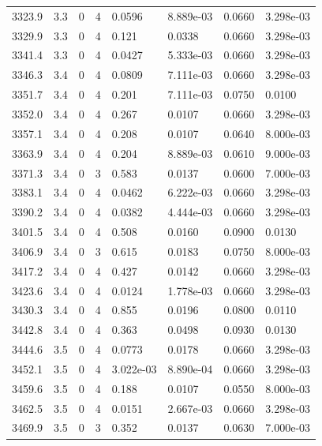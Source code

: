 \documentclass[preview]{standalone}
\begin{document}
{{{{{{{{{{{{{{{\begin{tabular}{L{1.2cm}C{1.2cm} C{0.3cm}C{0.5cm} C{1.4cm}C{1.4cm} C{1.4cm}C{1.4cm}}
  3323.9  &   3.3  & 0     &  4 &  0.0596  & 8.889e-03  & 0.0660 &  3.298e-03   \\ 
  3329.9  &   3.3  & 0     &  4 &  0.121  & 0.0338  & 0.0660 &  3.298e-03   \\ 
  3341.4  &   3.3  & 0     &  4 &  0.0427  & 5.333e-03  & 0.0660 &  3.298e-03   \\ 
  3346.3  &   3.4  & 0     &  4 &  0.0809  & 7.111e-03  & 0.0660 &  3.298e-03   \\ 
  3351.7  &   3.4  & 0     &  4 &  0.201  & 7.111e-03  & 0.0750 &  0.0100   \\ 
  3352.0  &   3.4  & 0     &  4 &  0.267  & 0.0107  & 0.0660 &  3.298e-03   \\ 
  3357.1  &   3.4  & 0     &  4 &  0.208  & 0.0107  & 0.0640 &  8.000e-03   \\ 
  3363.9  &   3.4  & 0     &  4 &  0.204  & 8.889e-03  & 0.0610 &  9.000e-03   \\ 
  3371.3  &   3.4  & 0     &  3 &  0.583  & 0.0137  & 0.0600 &  7.000e-03   \\ 
  3383.1  &   3.4  & 0     &  4 &  0.0462  & 6.222e-03  & 0.0660 &  3.298e-03   \\ 
  3390.2  &   3.4  & 0     &  4 &  0.0382  & 4.444e-03  & 0.0660 &  3.298e-03   \\ 
  3401.5  &   3.4  & 0     &  4 &  0.508  & 0.0160  & 0.0900 &  0.0130   \\ 
  3406.9  &   3.4  & 0     &  3 &  0.615  & 0.0183  & 0.0750 &  8.000e-03   \\ 
  3417.2  &   3.4  & 0     &  4 &  0.427  & 0.0142  & 0.0660 &  3.298e-03   \\ 
  3423.6  &   3.4  & 0     &  4 &  0.0124  & 1.778e-03  & 0.0660 &  3.298e-03   \\ 
  3430.3  &   3.4  & 0     &  4 &  0.855  & 0.0196  & 0.0800 &  0.0110   \\ 
  3442.8  &   3.4  & 0     &  4 &  0.363  & 0.0498  & 0.0930 &  0.0130   \\ 
  3444.6  &   3.5  & 0     &  4 &  0.0773  & 0.0178  & 0.0660 &  3.298e-03   \\ 
  3452.1  &   3.5  & 0     &  4 &  3.022e-03  & 8.890e-04  & 0.0660 &  3.298e-03   \\ 
  3459.6  &   3.5  & 0     &  4 &  0.188  & 0.0107  & 0.0550 &  8.000e-03   \\ 
  3462.5  &   3.5  & 0     &  4 &  0.0151  & 2.667e-03  & 0.0660 &  3.298e-03   \\ 
  3469.9  &   3.5  & 0     &  3 &  0.352  & 0.0137  & 0.0630 &  7.000e-03   \\ 

\end{tabular}}}}}}}}}}}}}}}}
\end{document}
